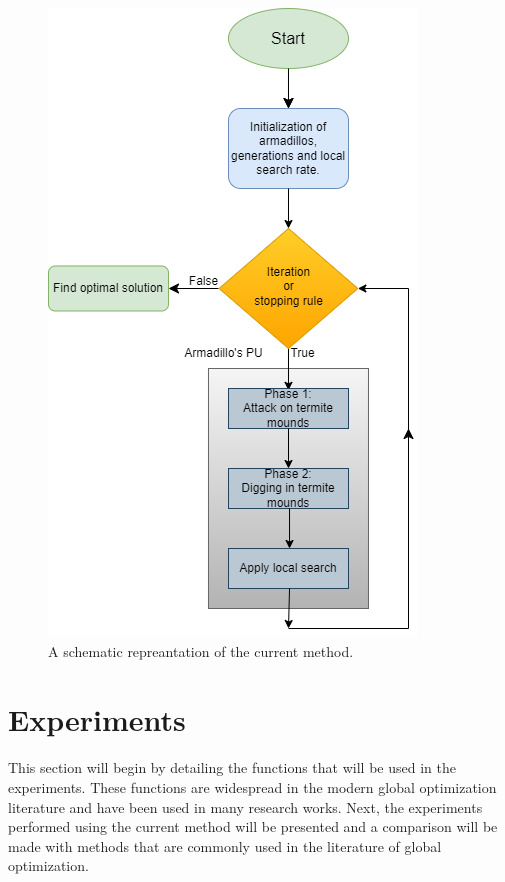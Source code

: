 \documentclass[journal,article,submit,pdftex,moreauthors]{Definitions/mdpi}
\begin{document}
\begin{figure}[H]

\hspace{-5pt}\includegraphics[scale=0.75]{armadillo_diagram.png}
\caption{A schematic repreantation of the current method. \label{fig:diagram}}
\end{figure}

\section{Experiments}\label{sec:Results}
This section will begin by detailing the functions that will be used in the experiments. These functions are widespread in the modern global optimization literature and have been used in many research works. Next, the experiments performed using the current method will be presented and a comparison will be made with methods that are commonly used in the literature of global optimization.
\end{document}
